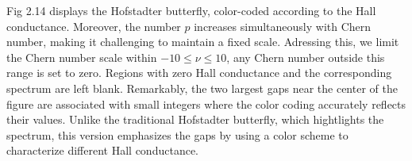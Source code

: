\documentclass{report}
\begin{document}


Fig 2.14 displays the Hofstadter butterfly, color-coded according to the Hall conductance. Moreover, the number $p$ increases simultaneously with Chern number, making it challenging to maintain a fixed scale. Adressing this, we limit the Chern number scale within $-10 \leq \nu \leq 10$, any Chern number outside this range is set to zero. Regions with zero Hall conductance and the corresponding spectrum are left blank. Remarkably, the two largest gaps near the center of the figure are associated with small integers where the color coding accurately reflects their values. Unlike the traditional Hofstadter butterfly, which hightlights the spectrum, this version emphasizes the gaps by using a color scheme to characterize different Hall conductance.
\end{document}
